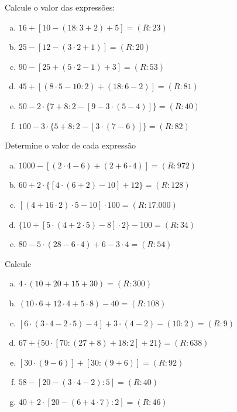 \item Calcule o valor das expressões:
	\begin{multicols}{2}
	\begin{enumerate}[a)]
		\item $16+[10-(18:3+2)+5]                       = (R: 23)$
		\item $25-[12-(3\cdot2+1)]                             = (R: 20)$
		\item $90-[25+(5\cdot2-1)+3]                         = ( R: 53)$
		\item $45+[(8\cdot5-10:2)+(18:6-2)]              = (R: 81)$
		\item $50-2\cdot\{7+8:2-[9-3\cdot(5-4)]\}              = (R: 40)$
		\item $100-3\cdot\{5+8:2-[3\cdot(7-6)]\}               = (R: 82)$
	\end{enumerate}
	\end{multicols}


\item Determine o valor de cada expressão
	\begin{multicols}{2}
	\begin{enumerate}[a)]
		\item $1000 - [(2 \cdot 4 - 6) + ( 2 + 6 \cdot 4)]      = (R: 972)$
		\item $60 + 2 \cdot \{[ 4 \cdot ( 6 + 2 ) - 10 ] + 12\}      = ( R: 128 )$
		\item $[( 4 + 16 \cdot 2) \cdot 5 - 10] \cdot 100   = (R: 17.000)$
		\item $\{ 10 + [ 5 \cdot ( 4 + 2 \cdot 5) - 8] \cdot 2 \} - 100  = ( R: 34)$
		\item $80 - 5 \cdot ( 28 - 6 \cdot 4 ) + 6 - 3 \cdot 4      = (R: 54)$
	\end{enumerate}
	\end{multicols}


\item Calcule
	\begin{multicols}{2}
	\begin{enumerate}[a)]
		\item $4 \cdot ( 10 + 20 + 15 + 30)  = (R: 300)$
		\item $(10 \cdot 6 + 12 \cdot 4 + 5 \cdot 8 ) - 40   = (R: 108)$
		\item $[ 6 \cdot ( 3 \cdot 4 - 2 \cdot 5) - 4 ] + 3 \cdot ( 4 - 2) - ( 10 : 2 ) = (R: 9)$
		\item $67 + \{ 50 \cdot [ 70 : ( 27 + 8 ) + 18 : 2 ] + 21 \}  = (R:638)$
		\item $[ 30 \cdot ( 9 - 6)] + [ 30 : ( 9 + 6 ) ]  = (R: 92)$
		\item $58 - [ 20 - ( 3 \cdot 4 - 2) : 5 ]= (R: 40)$
		\item $40 + 2 \cdot [ 20 - ( 6 + 4 \cdot 7 ) : 2 ] = ( R: 46)$
	\end{enumerate}
	\end{multicols}



